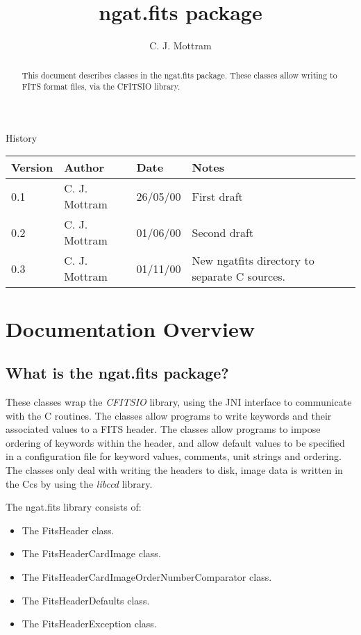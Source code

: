 \documentclass[10pt,a4paper]{article}
\title{ngat.fits package}
\author{C. J. Mottram}
\date{}
\begin{document}
\thispagestyle{empty}
\maketitle
\begin{abstract}
This document describes classes in the ngat.fits package.
These classes allow writing to FITS format files, via the CFITSIO library.
\end{abstract}

\centerline{\Large History}
\begin{center}
\begin{tabular}{|l|l|l|p{15em}|}
\hline
{\bf Version} & {\bf Author} & {\bf Date} & {\bf Notes} \\
\hline
0.1 & C. J. Mottram & 26/05/00 & First draft \\
0.2 & C. J. Mottram & 01/06/00 & Second draft \\
0.3 & C. J. Mottram & 01/11/00 & New ngatfits directory to separate C sources. \\
\hline
\end{tabular}
\end{center}

\newpage
\tableofcontents
\listoffigures
\listoftables
\newpage

\section{Documentation Overview}
\subsection{What is the ngat.fits package?}
These classes wrap the {\em CFITSIO} library, using the JNI interface to communicate with the C routines.
The classes allow programs to write keywords and their associated values to a FITS header. 
The classes allow programs to impose ordering of keywords within the header, and allow default values to
be specified in a configuration file for keyword values, comments, unit strings and ordering. The classes
only deal with writing the headers to disk, image data is written in the Ccs by using the {\em libccd}
\cite{bib:libccd} library.

The ngat.fits library consists of:
\begin{itemize}
\item The FitsHeader class.
\item The FitsHeaderCardImage class.
\item The FitsHeaderCardImageOrderNumberComparator class.
\item The FitsHeaderDefaults class.
\item The FitsHeaderException class.
\end{itemize}
 
\end{document}
